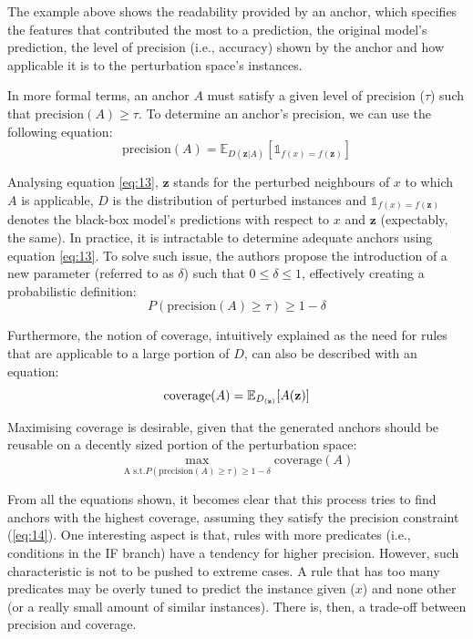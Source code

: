 The example above shows the readability provided by an anchor, which specifies the features that contributed the most to a prediction, the original model's prediction, the level of precision (i.e., accuracy) shown by the anchor and how applicable it is to the perturbation space's instances.

In more formal terms, an anchor $A$ must satisfy a given level of precision ($\tau$) such that $\text{precision}(A) \geqslant \tau$. To determine an anchor's precision, we can use the following equation:
\begin{equation}
    \text{precision}(A) = \mathbb{E}_{D(\mathbf{z}|A)}[\mathds{1}_{f(x)=f(\mathbf{z})}]
    \label{eq:13}
\end{equation}

Analysing equation \ref{eq:13}, $\mathbf{z}$ stands for the perturbed neighbours of $x$ to which $A$ is applicable, $D$ is the distribution of perturbed instances and $\mathds{1}_{f(x)=f(\mathbf{z})}$ denotes the black-box model's predictions with respect to $x$ and $\mathbf{z}$ (expectably, the same). In practice, it is intractable to determine adequate anchors using equation \ref{eq:13}. To solve such issue, the authors propose the introduction of a new parameter (referred to as $\delta$) such that $0 \leqslant \delta \leqslant 1$, effectively creating a probabilistic definition:
\begin{equation}
    P(\text{precision}(A) \geqslant \tau) \geqslant 1 - \delta
    \label{eq:14}
\end{equation}

Furthermore, the notion of coverage, intuitively explained as the need for rules that are applicable to a large portion of $D$, can also be described with an equation:
\begin{equation}
    \text{coverage}(A) = \operatorname{\mathbb{E}}_{D_{(\mathbf{z})}}[A(\mathbf{z})]
    \label{eq:15}
\end{equation}

Maximising coverage is desirable, given that the generated anchors should be reusable on a decently sized portion of the perturbation space:
\begin{equation}
    \max_{\text{A s.t.} P(\text{precision}(A) \geqslant \tau) \geqslant 1 - \delta} \text{coverage}(A)
    \label{eq:16}
\end{equation}

From all the equations shown, it becomes clear that this process tries to find anchors with the highest coverage, assuming they satisfy the precision constraint (\ref{eq:14}). One interesting aspect is that, rules with more predicates (i.e., conditions in the IF branch) have a tendency for higher precision. However, such characteristic is not to be pushed to extreme cases. A rule that has too many predicates may be overly tuned to predict the instance given ($x$) and none other (or a really small amount of similar instances). There is, then, a trade-off between precision and coverage. \\

